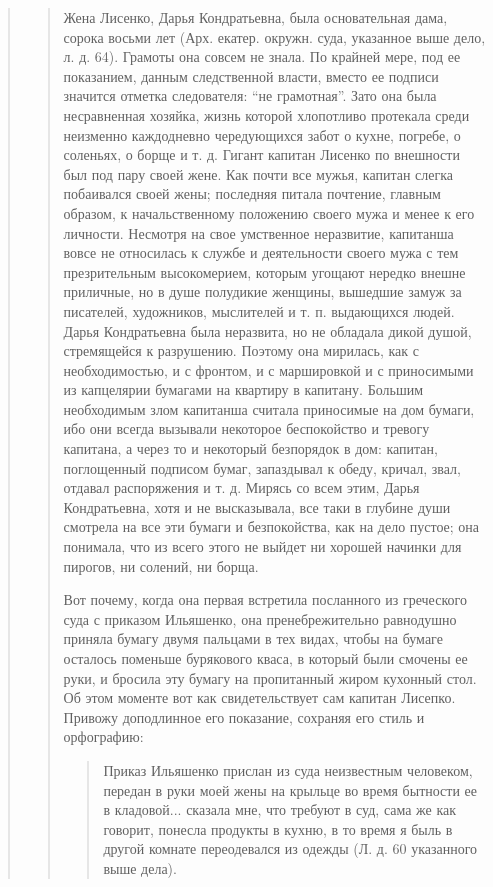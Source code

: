 \begin{quote}
\begin{quote}
Жена Лисенко, Дарья Кондратьевна, была основательная дама, сорока восьми лет 
(Арх. екатер. окружн. суда, указанное выше дело, л. д. 64). Грамоты она совсем не знала.
По крайней мере, под ее показанием, данным следственной власти,
 вместо ее подписи значится отметка следователя:
``не грамотная''. Зато она была несравненная хозяйка,
жизнь которой хлопотливо протекала среди неизменно каждодневно чередующихся 
забот о кухне, погребе, о соленьях,
о борще и т. д. Гигант капитан Лисенко по внешности
был под пару своей жене. Как почти все мужья, капитан слегка побаивался своей жены; 
последняя питала почтение, главным образом, к начальственному положению своего мужа и менее к его
личности. Несмотря на свое умственное неразвитие, капитанша вовсе не относилась к службе и деятельности
своего мужа с тем презрительным высокомерием, которым угощают нередко внешне приличные, но в душе полудикие
женщины, вышедшие замуж за писателей, художников, мыслителей и т. п. выдающихся людей.
Дарья Кондратьевна была неразвита, но не обладала дикой душой, стремящейся к разрушению.
Поэтому она мирилась, как с необходимостью, и с фронтом, и с маршировкой и с приносимыми из капцелярии
бумагами на квартиру в капитану. Большим необходимым
злом капитанша считала приносимые на дом бумаги, ибо
они всегда вызывали некоторое беспокойство и тревогу капитана, 
а через то и некоторый безпорядок в дом: капитан, поглощенный подписом бумаг, 
запаздывал к обеду, кричал, звал, отдавал распоряжения и т. д. Мирясь
со всем этим, Дарья Кондратьевна, хотя и не высказывала,
все таки в глубине души смотрела на все эти бумаги и безпокойства, 
как на дело пустое; она понимала, что из всего этого не
выйдет ни хорошей начинки для пирогов, ни солений, ни борща.

Вот почему, когда она первая встретила посланного
из греческого суда с приказом Ильяшенко, она пренебрежительно равнодушно приняла бумагу
двумя пальцами в
тех видах, чтобы на бумаге осталось поменьше бурякового
кваса, в который были смочены ее руки, и бросила эту
бумагу на пропитанный жиром кухонный стол. Об этом
моменте вот как свидетельствует сам капитан Лисепко.
Привожу доподлинное его показание, сохраняя его стиль и орфографию:

\begin{quote}
\em\bfseries
	
Приказ Ильяшенко прислан из суда неизвестным человеком, передан в руки моей
жены на крыльце во время бытности ее в кладовой... сказала мне, что
требуют в суд, сама же как говорит, понесла продукты в кухню, в то
время я быль в другой комнате переодевался из одежды (Л. д. 60
указанного выше дела).


\end{quote}
\end{quote}
\end{quote}
